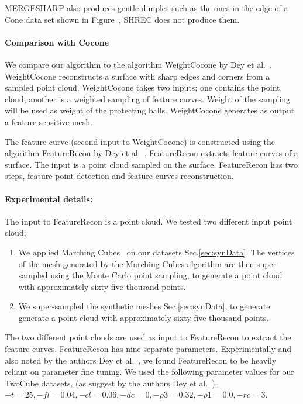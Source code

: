 MERGESHARP also produces gentle dimples such as the ones in the edge of a Cone data set shown in Figure~\protect{}, SHREC does not produce them. 	
\paragraph{Comparison with Cocone}
We compare our algorithm to the algorithm WeightCocone by Dey et al.~\cite{Dey2012}. WeightCocone reconstructs a surface with sharp edges and corners from a sampled point cloud. WeightCocone takes two inputs; one contains the point cloud, another is a weighted sampling of feature curves. Weight of the sampling will be used as weight of the protecting balls. WeightCocone generates as output a feature sensitive mesh. 

The feature curve (second input to WeightCocone) is constructed using the algorithm FeatureRecon by Dey et al.~\cite{Dey2013}. FeatureRecon extracts feature curves of a surface. The input is a point cloud sampled on the surface. FeatureRecon has two steps, feature point detection and feature curves reconstruction. 
\paragraph{Experimental details:} The input to FeatureRecon is a point cloud. We tested two different input point cloud;
\begin{enumerate}
	\item We applied Marching Cubes~\cite{lc-mchr3-87} on our datasets Sec.\ref{sec:synData}. The vertices of the mesh generated by the Marching Cubes algorithm are then super-sampled using the Monte Carlo point sampling, to generate a point cloud with approximately sixty-five thousand points.
	\item We super-sampled the synthetic meshes Sec.\ref{sec:synData}, to generate generate a point cloud with approximately sixty-five thousand points.
\end{enumerate}
The two different point clouds are used as input to FeatureRecon to extract the feature curves. 
FeatureRecon has nine separate parameters. Experimentally and also noted by the authors Dey et al.~\cite{Dey2013}, we found FeatureRecon to be heavily reliant on parameter fine tuning. We used the following parameter values for our TwoCube datasets, (as suggest by the authors Dey et al.~\cite{Dey2013}). 
$-t = 25,-fl = 0.04, -cl = 0.06, -dc = 0, -\rho3 = 0.32, -\rho1 = 0.0, -rc = 3$.

